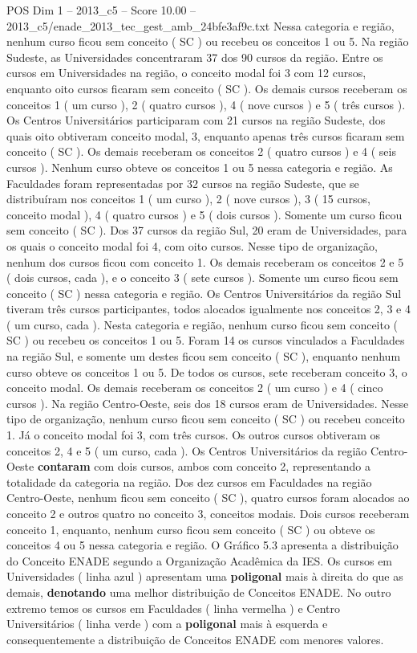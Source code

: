 \begin{textsample}{POS Dim 1 – 2013\_c5 – Score 10.00 – 2013\_c5/enade\_2013\_tec\_gest\_amb\_24bfe3af9c.txt}
Nessa categoria e região, nenhum curso ficou sem conceito ( SC ) ou recebeu os conceitos 1 ou 5.
Na região Sudeste, as Universidades concentraram 37 dos 90 cursos da região.
Entre os cursos em Universidades na região, o conceito modal foi 3 com 12 cursos, enquanto oito cursos ficaram sem conceito ( SC ).
Os demais cursos receberam os conceitos 1 ( um curso ), 2 ( quatro cursos ), 4 ( nove cursos ) e 5 ( três cursos ).
Os Centros Universitários participaram com 21 cursos na região Sudeste, dos quais oito obtiveram conceito modal, 3, enquanto apenas três cursos ficaram sem conceito ( SC ).
Os demais receberam os conceitos 2 ( quatro cursos ) e 4 ( seis cursos ).
Nenhum curso obteve os conceitos 1 ou 5 nessa categoria e região.
As Faculdades foram representadas por 32 cursos na região Sudeste, que se distribuíram nos conceitos 1 ( um curso ), 2 ( nove cursos ), 3 ( 15 cursos, conceito modal ), 4 ( quatro cursos ) e 5 ( dois cursos ).
Somente um curso ficou sem conceito ( SC ).
Dos 37 cursos da região Sul, 20 eram de Universidades, para os quais o conceito modal foi 4, com oito cursos.
Nesse tipo de organização, nenhum dos cursos ficou com conceito 1.
Os demais receberam os conceitos 2 e 5 ( dois cursos, cada ), e o conceito 3 ( sete cursos ).
Somente um curso ficou sem conceito ( SC ) nessa categoria e região.
Os Centros Universitários da região Sul tiveram três cursos participantes, todos alocados igualmente nos conceitos 2, 3 e 4 ( um curso, cada ).
Nesta categoria e região, nenhum curso ficou sem conceito ( SC ) ou recebeu os conceitos 1 ou 5.
Foram 14 os cursos vinculados a Faculdades na região Sul, e somente um destes ficou sem conceito ( SC ), enquanto nenhum curso obteve os conceitos 1 ou 5.
De todos os cursos, sete receberam conceito 3, o conceito modal.
Os demais receberam os conceitos 2 ( um curso ) e 4 ( cinco cursos ).
Na região Centro-Oeste, seis dos 18 cursos eram de Universidades.
Nesse tipo de organização, nenhum curso ficou sem conceito ( SC ) ou recebeu conceito 1.
Já o conceito modal foi 3, com três cursos.
Os outros cursos obtiveram os conceitos 2, 4 e 5 ( um curso, cada ).
Os Centros Universitários da região Centro-Oeste \textbf{contaram} com dois cursos, ambos com conceito 2, representando a totalidade da categoria na região.
Dos dez cursos em Faculdades na região Centro-Oeste, nenhum ficou sem conceito ( SC ), quatro cursos foram alocados ao conceito 2 e outros quatro no conceito 3, conceitos modais.
Dois cursos receberam conceito 1, enquanto, nenhum curso ficou sem conceito ( SC ) ou obteve os conceitos 4 ou 5 nessa categoria e região.
O Gráfico 5.3 apresenta a distribuição do Conceito ENADE segundo a Organização Acadêmica da IES.
Os cursos em Universidades ( linha azul ) apresentam uma \textbf{poligonal} mais à direita do que as demais, \textbf{denotando} uma melhor distribuição de Conceitos ENADE.
No outro extremo temos os cursos em Faculdades ( linha vermelha ) e Centro Universitários ( linha verde ) com a \textbf{poligonal} mais à esquerda e consequentemente a distribuição de Conceitos ENADE com menores valores.

\end{textsample}
